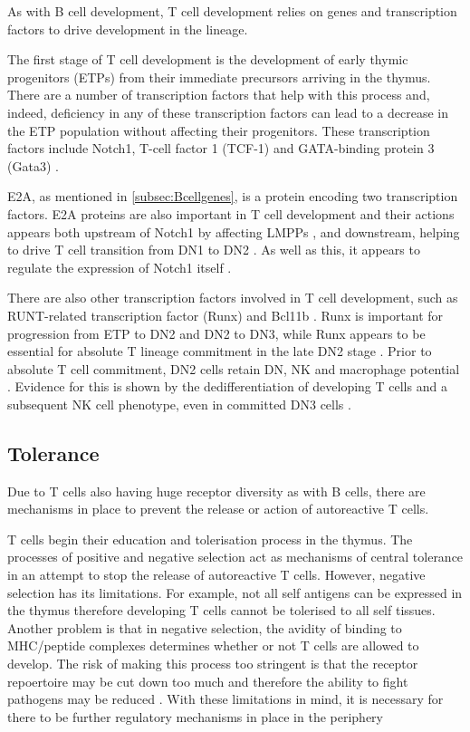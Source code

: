 As with B cell development, T cell development relies on genes and transcription factors to drive development in the lineage.

The first stage of T cell development is the development of early thymic progenitors (ETPs) from their immediate precursors arriving in the thymus.
There are a number of transcription factors that help with this process and, indeed, deficiency in any of these transcription factors can lead to a decrease in the ETP population without affecting their progenitors.
These transcription factors include Notch1, T-cell factor 1 (TCF-1) and GATA-binding protein 3 (Gata3) \citep{Sambandam2005, Naito2011, Weber2011, Hosoya2009}.

E2A, as mentioned in \cref{subsec:Bcellgenes}, is a protein encoding two transcription factors.
E2A proteins are also important in T cell development and their actions appears both upstream of Notch1 by affecting LMPPs \citep{Dias2008}, and downstream, helping to drive T cell transition from DN1 to DN2 \citep{Naito2011}.
As well as this, it appears to regulate the expression of Notch1 itself \citep{Dias2008}.

There are also other transcription factors involved in T cell development, such as RUNT-related transcription factor (Runx) and Bcl11b \citep{Naito2011}.
Runx is important for progression from ETP to DN2 and DN2 to DN3, while Runx appears to be essential for absolute T lineage commitment in the late DN2 stage \citep{Liu2010, Naito2011}. 
Prior to absolute T cell commitment, DN2 cells retain DN, NK and macrophage potential \citep{Naito2011}.
Evidence for this is shown by the dedifferentiation of developing T cells and a subsequent NK cell phenotype, even in committed DN3 cells \citep{Liu2010}.




\subsection{Tolerance}
\label{subsec:Tcelltolerance}

Due to T cells also having huge receptor diversity as with B cells, there are mechanisms in place to prevent the release or action of autoreactive T cells.

T cells begin their education and tolerisation process in the thymus.
The processes of positive and negative selection act as mechanisms of central tolerance in an attempt to stop the release of autoreactive T cells\citep{Walker2002}.
However, negative selection has its limitations.
For example, not all self antigens can be expressed in the thymus therefore developing T cells cannot be tolerised to all self tissues.
Another problem is that in negative selection, the avidity of binding to MHC/peptide complexes determines whether or not T cells are allowed to develop.
The risk of making this process too stringent is that the receptor repoertoire may be cut down too much and therefore the ability to fight pathogens may be reduced \citep{Walker2002}.
With these limitations in mind, it is necessary for there to be further regulatory mechanisms in place in the periphery


